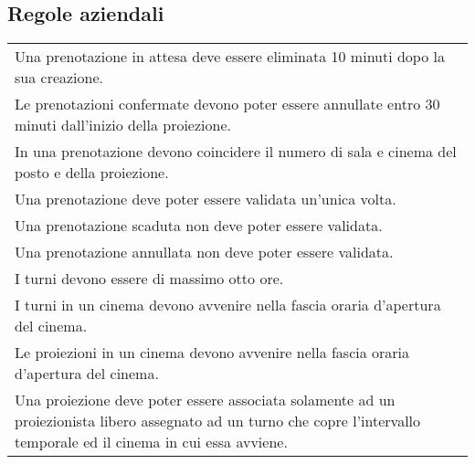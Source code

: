\subsection*{Regole aziendali}
%
%
\begin{longtable}{|p{16.75cm}|}
    \hline
    \rowcolor{tblhdrcolor}
    \multicolumn{1}{|c|}{\textbf{Regole di vincolo}}
    \\\hline
    Una prenotazione in attesa deve essere eliminata 10 minuti dopo
    la sua creazione.                                           \\\hline
    Le prenotazioni confermate devono poter essere annullate entro 30 minuti
    dall'inizio della proiezione.                               \\\hline
    In una prenotazione devono coincidere il numero di sala e cinema del posto
    e della proiezione.                                         \\\hline
    Una prenotazione deve poter essere validata un'unica volta. \\\hline
    Una prenotazione scaduta non deve poter essere validata.    \\\hline
    Una prenotazione annullata non deve poter essere validata.  \\\hline
    I turni devono essere di massimo otto ore.                  \\\hline
    I turni in un cinema devono avvenire nella fascia oraria d'apertura
    del cinema.                                                 \\\hline
    Le proiezioni in un cinema devono avvenire nella fascia oraria d'apertura
    del cinema.                                                 \\\hline
    Una proiezione deve poter essere associata solamente ad un proiezionista
    libero assegnato ad un turno che copre l'intervallo temporale ed il
    cinema in cui essa avviene.                                 \\\hline

\end{longtable}
